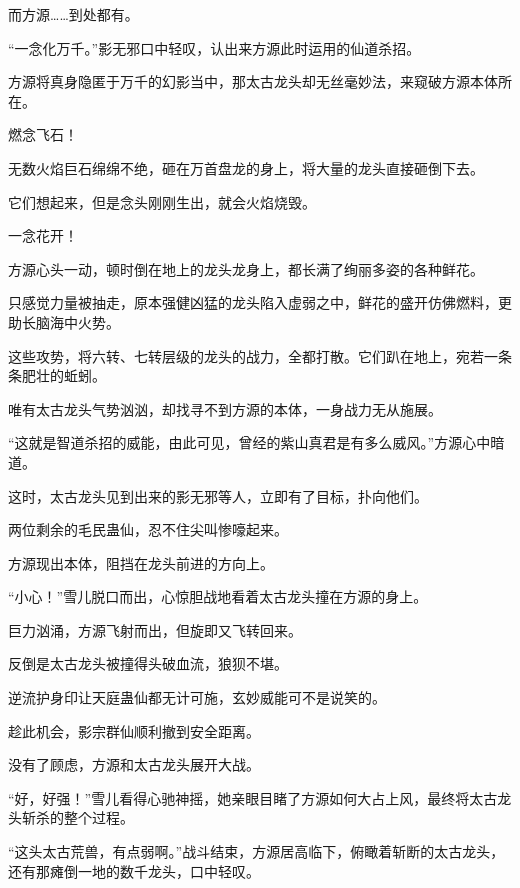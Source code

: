 \begin{this_body}
而方源……到处都有。

“一念化万千。”影无邪口中轻叹，认出来方源此时运用的仙道杀招。

方源将真身隐匿于万千的幻影当中，那太古龙头却无丝毫妙法，来窥破方源本体所在。

燃念飞石！

无数火焰巨石绵绵不绝，砸在万首盘龙的身上，将大量的龙头直接砸倒下去。

它们想起来，但是念头刚刚生出，就会火焰烧毁。

一念花开！

方源心头一动，顿时倒在地上的龙头龙身上，都长满了绚丽多姿的各种鲜花。

只感觉力量被抽走，原本强健凶猛的龙头陷入虚弱之中，鲜花的盛开仿佛燃料，更助长脑海中火势。

这些攻势，将六转、七转层级的龙头的战力，全都打散。它们趴在地上，宛若一条条肥壮的蚯蚓。

唯有太古龙头气势汹汹，却找寻不到方源的本体，一身战力无从施展。

“这就是智道杀招的威能，由此可见，曾经的紫山真君是有多么威风。”方源心中暗道。

这时，太古龙头见到出来的影无邪等人，立即有了目标，扑向他们。

两位剩余的毛民蛊仙，忍不住尖叫惨嚎起来。

方源现出本体，阻挡在龙头前进的方向上。

“小心！”雪儿脱口而出，心惊胆战地看着太古龙头撞在方源的身上。

巨力汹涌，方源飞射而出，但旋即又飞转回来。

反倒是太古龙头被撞得头破血流，狼狈不堪。

逆流护身印让天庭蛊仙都无计可施，玄妙威能可不是说笑的。

趁此机会，影宗群仙顺利撤到安全距离。

没有了顾虑，方源和太古龙头展开大战。

“好，好强！”雪儿看得心驰神摇，她亲眼目睹了方源如何大占上风，最终将太古龙头斩杀的整个过程。

“这头太古荒兽，有点弱啊。”战斗结束，方源居高临下，俯瞰着斩断的太古龙头，还有那瘫倒一地的数千龙头，口中轻叹。

\end{this_body}

